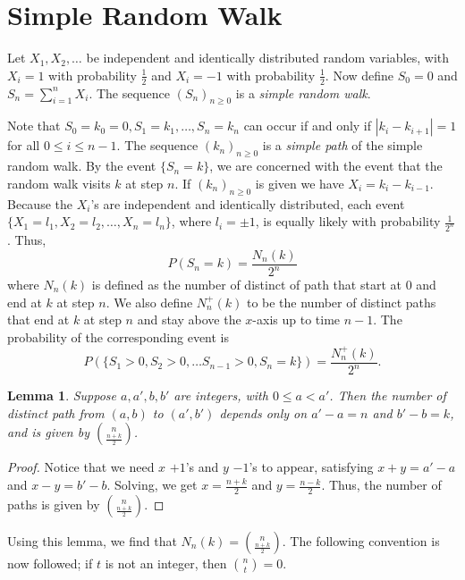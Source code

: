 \documentclass[15pt,a4paper]{book}
\newtheorem{lemma}[theorem]{Lemma}
\theoremstyle{definition}
\newcommand{\eax}[1]{\emph{#1}\index{#1}} %
\newcommand{\abs}[1]{\left| #1 \right|} %
\begin{document}
\section{Simple Random Walk}
Let $X_{1},X_{2},\ldots$ be independent and identically distributed random variables, with $X_{i} = 1$ with probability $\frac{1}{2}$ and $X_{i}=-1$ with probability $\frac{1}{2}$. Now define $S_{0}=0$ and $S_{n} = \sum_{i=1}^{n} X_{i}$. The sequence $(S_{n})_{n \geq 0}$ is a \eax{simple random walk}.

Note that $S_{0}=k_{0}=0,S_{1}=k_{1},\ldots,S_{n}=k_{n}$ can occur if and only if $\abs{k_{i}-k_{i+1}} = 1$ for all $0 \leq i \leq n-1$. The sequence $(k_{n})_{n \geq 0}$ is a \eax{simple path} of the simple random walk. By the event $\{S_{n}=k\}$, we are concerned with the event that the random walk visits $k$ at step $n$. If $(k_{n})_{n \geq 0}$ is given we have $X_{i} = k_{i}-k_{i-1}$. Because the $X_{i}$'s are independent and identically distributed, each event $\{X_{1}=l_{1},X_{2}=l_{2},\ldots,X_{n}=l_{n}\}$, where $l_{i} = \pm 1$, is equally likely with probability $\frac{1}{2^{n}}$. Thus,
\begin{equation}
    P(S_{n}=k) = \frac{N_{n}(k)}{2^{n}}
\end{equation}
where $N_{n}(k)$ is defined as the number of distinct of path that start at $0$ and end at $k$ at step $n$. We also define $N_{n}^{+}(k)$ to be the number of distinct paths that end at $k$ at step $n$ and stay above the $x$-axis up to time $n-1$. The probability of the corresponding event is
\begin{equation}
    P(\{S_{1} > 0, S_{2} > 0, \ldots S_{n-1} > 0, S_{n} = k\}) = \frac{N_{n}^{+}(k)}{2^{n}}.
\end{equation}

\begin{lemma}
    Suppose $a,a',b,b'$ are integers, with $0 \leq a < a'$. Then the number of distinct path from $(a,b)$ to $(a',b')$ depends only on $a'-a = n$ and $b'-b = k$, and is given by $\binom{n}{\frac{n+k}{2}}$.
\end{lemma}
\begin{proof}
    Notice that we need $x$ $+1$'s and $y$ $-1$'s to appear, satisfying $x+y = a'-a$ and $x-y = b'-b$. Solving, we get $x = \frac{n+k}{2}$ and $y = \frac{n-k}{2}$. Thus, the number of paths is given by $\binom{n}{\frac{n+k}{2}}$.
\end{proof}
Using this lemma, we find that $N_{n}(k) = \binom{n}{\frac{n+k}{2}}$. The following convention is now followed; if $t$ is not an integer, then $\binom{n}{t} = 0$.
\end{document}
